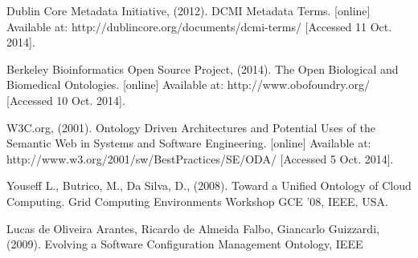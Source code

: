 \newblock Dublin Core Metadata Initiative, (2012). DCMI Metadata Terms. [online] Available at: http://dublincore.org/documents/dcmi-terms/ [Accessed 11 Oct. 2014].

\newblock Berkeley Bioinformatics Open Source Project, (2014). The Open Biological and Biomedical Ontologies. [online] Available at: http://www.obofoundry.org/ [Accessed 10 Oct. 2014].

\newblock W3C.org, (2001). Ontology Driven Architectures and Potential Uses of the Semantic Web in Systems and Software Engineering. [online] Available at:
 http://www.w3.org/2001/sw/BestPractices/SE/ODA/ [Accessed 5 Oct. 2014].

\newblock Youseff L., Butrico, M., Da Silva, D., (2008). Toward a Unified Ontology of Cloud Computing. Grid Computing Environments Workshop GCE '08, IEEE, USA.

\newblock Lucas de Oliveira Arantes, Ricardo de Almeida Falbo, Giancarlo Guizzardi, (2009). Evolving a Software Configuration Management Ontology, IEEE












